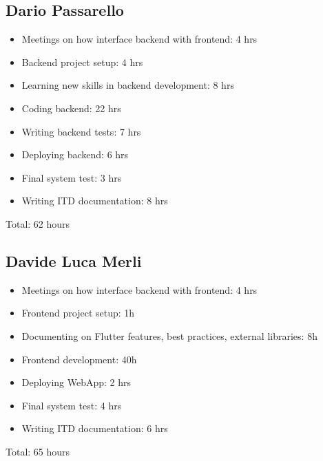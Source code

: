 \subsection{Dario Passarello}
\begin{itemize}
    \item Meetings on how interface backend with frontend: 4 hrs
    \item Backend project setup: 4 hrs
    \item Learning new skills in backend development: 8 hrs
    \item Coding backend: 22 hrs
    \item Writing backend tests: 7 hrs
    \item Deploying backend: 6 hrs
    \item Final system test: 3 hrs
    \item Writing ITD documentation: 8 hrs
\end{itemize}
Total: 62 hours

\subsection{Davide Luca Merli}
\begin{itemize}
    \item Meetings on how interface backend with frontend: 4 hrs
    \item Frontend project setup: 1h
    \item Documenting on Flutter features, best practices, external libraries: 8h
    \item Frontend development: 40h
    \item Deploying WebApp: 2 hrs
    \item Final system test: 4 hrs
    \item Writing ITD documentation: 6 hrs
\end{itemize}
Total: 65 hours